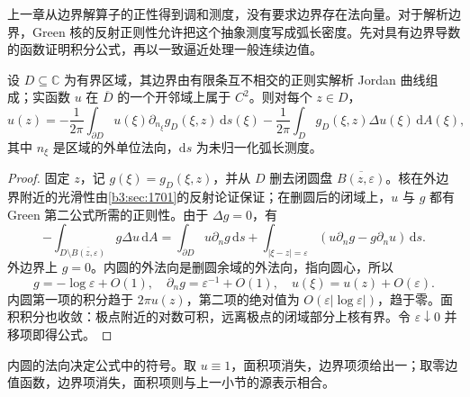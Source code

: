 上一章从边界解算子的正性得到调和测度，没有要求边界存在法向量。对于解析边界，Green 核的反射正则性允许把这个抽象测度写成弧长密度。先对具有边界导数的函数证明积分公式，再以一致逼近处理一般连续边值。

\begin{proposition}\label{b3:prop:17-green-representation}
设 \(D\subseteq\mathbb C\) 为有界区域，其边界由有限条互不相交的正则实解析 Jordan 曲线组成；实函数 \(u\) 在 \(\overline D\) 的一个开邻域上属于 \(C^2\)。则对每个 \(z\in D\)，
\begin{equation}\label{b3:eq:17-green-representation}
 u(z)=-\frac1{2\pi}\int_{\partial D}u(\xi)\partial_{n_\xi}g_D(\xi,z)\,\mathrm ds(\xi)
 -\frac1{2\pi}\int_Dg_D(\xi,z)\Delta u(\xi)\,\mathrm dA(\xi),
\end{equation}
其中 \(n_\xi\) 是区域的外单位法向，\(\mathrm ds\) 为未归一化弧长测度。
\end{proposition}
\begin{proof}
固定 \(z\)，记 \(g(\xi)=g_D(\xi,z)\)，并从 \(D\) 删去闭圆盘 \(\overline{B(z,\varepsilon)}\)。核在外边界附近的光滑性由\cref{b3:sec:1701}的反射论证保证；在删圆后的闭域上，\(u\) 与 \(g\) 都有 Green 第二公式所需的正则性。由于 \(\Delta g=0\)，有
\[
 -\int_{D\setminus\overline{B(z,\varepsilon)}}g\Delta u\,\mathrm dA
 =\int_{\partial D}u\partial_ng\,\mathrm ds
 +\int_{|\xi-z|=\varepsilon}
       (u\partial_ng-g\partial_nu)\,\mathrm ds.
\]
外边界上 \(g=0\)。内圆的外法向是删圆余域的外法向，指向圆心，所以
\[
 g=-\log\varepsilon+O(1),
 \quad \partial_ng=\varepsilon^{-1}+O(1),
 \quad u(\xi)=u(z)+O(\varepsilon).
\]
内圆第一项的积分趋于 \(2\pi u(z)\)，第二项的绝对值为 \(O(\varepsilon|\log\varepsilon|)\)，趋于零。面积积分也收敛：极点附近的对数可积，远离极点的闭域部分上核有界。令 \(\varepsilon\downarrow0\) 并移项即得公式。
\end{proof}

内圆的法向决定公式中的符号。取 \(u\equiv1\)，面积项消失，边界项须给出一；取零边值函数，边界项消失，面积项则与上一小节的源表示相合。

